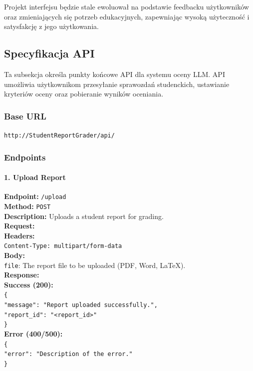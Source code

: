 \documentclass[a4paper, 12pt]{article}
\begin{document}
Projekt interfejsu będzie stale ewoluował na podstawie feedbacku użytkowników oraz zmieniających się potrzeb edukacyjnych, zapewniając wysoką użyteczność i satysfakcję z jego użytkowania.

\subsection{Specyfikacja API}

Ta subsekcja określa punkty końcowe API dla systemu oceny LLM. API umożliwia użytkownikom przesyłanie sprawozdań studenckich, ustawianie kryteriów oceny oraz pobieranie wyników oceniania.

\subsubsection*{Base URL}

\texttt{http://StudentReportGrader/api/}

\subsubsection*{Endpoints}

\paragraph{1. Upload Report}

\begin{tabbing}
\textbf{Endpoint:} \= \texttt{/upload} \\
\textbf{Method:} \> \texttt{POST} \\
\textbf{Description:} \> Uploads a student report for grading. \\
\textbf{Request:} \\
\> \textbf{Headers:} \\
\> \> \texttt{Content-Type: multipart/form-data} \\
\> \textbf{Body:} \\
\> \> \texttt{file}: The report file to be uploaded (PDF, Word, LaTeX). \\
\textbf{Response:} \\
\> \textbf{Success (200):} \\
\> \> \texttt{\{ \\
\> \> \> "message": "Report uploaded successfully.", \\
\> \> \> "report\_id": "<report\_id>" \\
\> \> \}} \\
\> \textbf{Error (400/500):} \\
\> \> \texttt{\{ \\
\> \> \> "error": "Description of the error." \\
\> \> \}}
\end{tabbing}
\end{document}
